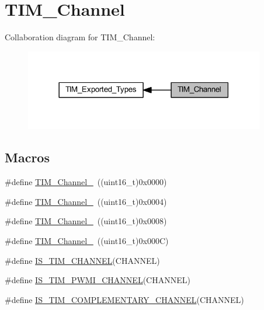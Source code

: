 \hypertarget{group___t_i_m___channel}{}\section{T\+I\+M\+\_\+\+Channel}
\label{group___t_i_m___channel}
Collaboration diagram for T\+I\+M\+\_\+\+Channel\+:
\nopagebreak
\begin{figure}[H]
\begin{center}
\leavevmode
\includegraphics[width=297pt]{group___t_i_m___channel}
\end{center}
\end{figure}
\subsection*{Macros}
\begin{DoxyCompactItemize}
\item 
\#define \hyperlink{group___t_i_m___channel_ga69ea7f558f02c63dd1082d784d2449bd}{T\+I\+M\+\_\+\+Channel\+\_}~((uint16\+\_\+t)0x0000)
\item 
\#define \hyperlink{group___t_i_m___channel_ga03d7da8269a87a560f68985b4bd80931}{T\+I\+M\+\_\+\+Channel\+\_}~((uint16\+\_\+t)0x0004)
\item 
\#define \hyperlink{group___t_i_m___channel_ga012711b19e8c91f6f352801a3dc0bcc9}{T\+I\+M\+\_\+\+Channel\+\_}~((uint16\+\_\+t)0x0008)
\item 
\#define \hyperlink{group___t_i_m___channel_ga7414888c40d066af235bc1f80b99bd9d}{T\+I\+M\+\_\+\+Channel\+\_}~((uint16\+\_\+t)0x000\+C)
\item 
\#define \hyperlink{group___t_i_m___channel_gae9721e3731e5fd983c83a9c1d32ef03d}{I\+S\+\_\+\+T\+I\+M\+\_\+\+C\+H\+A\+N\+N\+EL}(C\+H\+A\+N\+N\+EL)
\item 
\#define \hyperlink{group___t_i_m___channel_gacbf272b7a14f63b38bdbf18577835dce}{I\+S\+\_\+\+T\+I\+M\+\_\+\+P\+W\+M\+I\+\_\+\+C\+H\+A\+N\+N\+EL}(C\+H\+A\+N\+N\+EL)
\item 
\#define \hyperlink{group___t_i_m___channel_ga6f44459b7dfc4138bbc2c3795311c48c}{I\+S\+\_\+\+T\+I\+M\+\_\+\+C\+O\+M\+P\+L\+E\+M\+E\+N\+T\+A\+R\+Y\+\_\+\+C\+H\+A\+N\+N\+EL}(C\+H\+A\+N\+N\+EL)
\end{DoxyCompactItemize}


